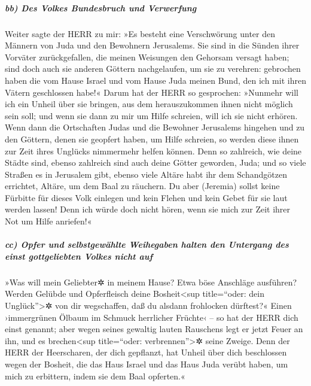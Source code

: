 \hypertarget{bb-des-volkes-bundesbruch-und-verwerfung}{%
\subparagraph{bb) Des Volkes Bundesbruch und
Verwerfung}\label{bb-des-volkes-bundesbruch-und-verwerfung}}

Weiter sagte der HERR zu mir: »Es besteht eine
Verschwörung unter den Männern von Juda und den Bewohnern Jerusalems.
Sie sind in die Sünden ihrer Vorväter zurückgefallen, die
meinen Weisungen den Gehorsam versagt haben; sind doch auch sie anderen
Göttern nachgelaufen, um sie zu verehren: gebrochen haben die vom Hause
Israel und vom Hause Juda meinen Bund, den ich mit ihren Vätern
geschlossen habe!« Darum hat der HERR so gesprochen:
»Nunmehr will ich ein Unheil über sie bringen, aus dem herauszukommen
ihnen nicht möglich sein soll; und wenn sie dann zu mir um Hilfe
schreien, will ich sie nicht erhören. Wenn dann die
Ortschaften Judas und die Bewohner Jerusalems hingehen und zu den
Göttern, denen sie geopfert haben, um Hilfe schreien, so werden diese
ihnen zur Zeit ihres Unglücks nimmermehr helfen können.
Denn so zahlreich, wie deine Städte sind, ebenso
zahlreich sind auch deine Götter geworden, Juda; und so viele Straßen es
in Jerusalem gibt, ebenso viele Altäre habt ihr dem Schandgötzen
errichtet, Altäre, um dem Baal zu räuchern. Du aber
(Jeremia) sollst keine Fürbitte für dieses Volk einlegen und kein Flehen
und kein Gebet für sie laut werden lassen! Denn ich würde doch nicht
hören, wenn sie mich zur Zeit ihrer Not um Hilfe anriefen!«

\hypertarget{cc-opfer-und-selbstgewuxe4hlte-weihegaben-halten-den-untergang-des-einst-gottgeliebten-volkes-nicht-auf}{%
\subparagraph{cc) Opfer und selbstgewählte Weihegaben halten den
Untergang des einst gottgeliebten Volkes nicht
auf}\label{cc-opfer-und-selbstgewuxe4hlte-weihegaben-halten-den-untergang-des-einst-gottgeliebten-volkes-nicht-auf}}

»Was will mein Geliebter✲ in meinem Hause? Etwa böse
Anschläge ausführen? Werden Gelübde und Opferfleisch deine
Bosheit\textless sup title=``oder: dein Unglück''\textgreater✲ von dir
wegschaffen, daß du alsdann frohlocken dürftest?« Einen
›immergrünen Ölbaum im Schmuck herrlicher Früchte‹ -- so hat der HERR
dich einst genannt; aber wegen seines gewaltig lauten Rauschens legt er
jetzt Feuer an ihn, und es brechen\textless sup title=``oder:
verbrennen''\textgreater✲ seine Zweige. Denn der HERR der
Heerscharen, der dich gepflanzt, hat Unheil über dich beschlossen wegen
der Bosheit, die das Haus Israel und das Haus Juda verübt haben, um mich
zu erbittern, indem sie dem Baal opferten.«

